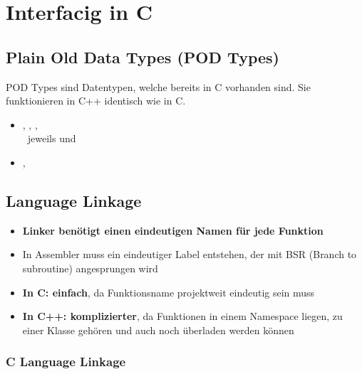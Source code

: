 \section{Interfacig in C}

\subsection{Plain Old Data Types (POD Types)}



\begin{minipage}[t]{0.58\columnwidth}
    \raggedright  
    POD Types sind Datentypen, welche bereits in C vorhanden sind. Sie funktionieren in C++ identisch wie in C.
\end{minipage}
\hfill
\begin{minipage}[t]{0.4\columnwidth}
    \raggedright  

    \begin{itemize}
        \item {}, , ,  \\
            \textrightarrow\ jeweils  und 
        \item {}, 
    \end{itemize}
\end{minipage}


\subsection{Language Linkage}

\begin{itemize}
    \item \textbf{Linker benötigt einen eindeutigen Namen für jede Funktion}
    \item In Assembler muss ein eindeutiger Label entstehen, der mit BSR (Branch to subroutine) angesprungen wird
    \item \textbf{In C: einfach}, da Funktionsname projektweit eindeutig sein muss
    \item \textbf{In C++: komplizierter}, da Funktionen in einem Namespace liegen, zu einer Klasse gehören und auch noch überladen werden können
\end{itemize}


\subsubsection{C Language Linkage}

